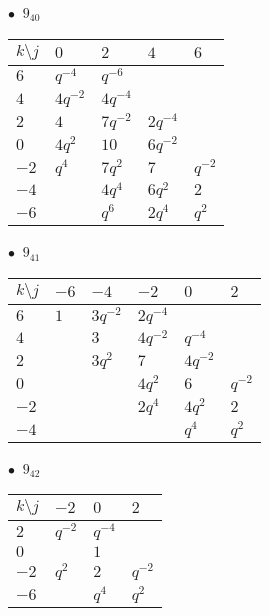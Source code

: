 %
\begin{minipage}{\linewidth}
$\bullet\ $ $9_{40}$ \vspace{0.5em} \\
\begin{tabular}{l|llll}
$k \setminus j$ & $0$ & $2$ & $4$ & $6$ \\
\hline
$6$ & $q^{-4}$ & $q^{-6}$ &  &  \\
$4$ & $4q^{-2}$ & $4q^{-4}$ &  &  \\
$2$ & $4$ & $7q^{-2}$ & $2q^{-4}$ &  \\
$0$ & $4q^{2}$ & $10$ & $6q^{-2}$ &  \\
$-2$ & $q^{4}$ & $7q^{2}$ & $7$ & $q^{-2}$ \\
$-4$ &  & $4q^{4}$ & $6q^{2}$ & $2$ \\
$-6$ &  & $q^{6}$ & $2q^{4}$ & $q^{2}$ \\
\end{tabular}
\vspace{2em}
\end{minipage}
%
\begin{minipage}{\linewidth}
$\bullet\ $ $9_{41}$ \vspace{0.5em} \\
\begin{tabular}{l|lllll}
$k \setminus j$ & $-6$ & $-4$ & $-2$ & $0$ & $2$ \\
\hline
$6$ & $1$ & $3q^{-2}$ & $2q^{-4}$ &  &  \\
$4$ &  & $3$ & $4q^{-2}$ & $q^{-4}$ &  \\
$2$ &  & $3q^{2}$ & $7$ & $4q^{-2}$ &  \\
$0$ &  &  & $4q^{2}$ & $6$ & $q^{-2}$ \\
$-2$ &  &  & $2q^{4}$ & $4q^{2}$ & $2$ \\
$-4$ &  &  &  & $q^{4}$ & $q^{2}$ \\
\end{tabular}
\vspace{2em}
\end{minipage}
%
\begin{minipage}{\linewidth}
$\bullet\ $ $9_{42}$ \vspace{0.5em} \\
\begin{tabular}{l|lll}
$k \setminus j$ & $-2$ & $0$ & $2$ \\
\hline
$2$ & $q^{-2}$ & $q^{-4}$ &  \\
$0$ &  & $1$ &  \\
$-2$ & $q^{2}$ & $2$ & $q^{-2}$ \\
$-6$ &  & $q^{4}$ & $q^{2}$ \\
\end{tabular}
\vspace{2em}
\end{minipage}
